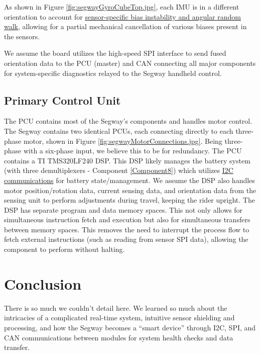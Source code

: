 \documentclass[]{formalLabReport}
\begin{document}
As shown in Figure \underline{\ref{fig:segwayGyroCubeTop.jpg}}, each IMU is in a different orientation to account for \href{https://base.xsens.com/hc/en-us/articles/209611089-Understanding-Sensor-Bias-offset-}{\underline{sensor-specific} \underline{bias instability and angular random walk}}, allowing for a partial mechanical cancellation of various biases present in the sensors. 

We assume the board utilizes the high-speed SPI interface to send fused orientation data to the PCU (master) and CAN connecting all major components for system-specific diagnostics relayed to the Segway handheld control.

\subsection{Primary Control Unit}
The PCU contains most of the Segway’s components and handles motor control. The Segway contains two identical PCUs, each connecting directly to each three-phase motor, shown in Figure \underline{\ref{fig:segwayMotorConnections.jpg}}. Being three-phase with a six-phase input, we believe this to be for redundancy. The PCU contains a TI TMS320LF240 DSP. This DSP likely manages the battery system (with three demultiplexers - Component \underline{\ref{Component8}}) which utilizes \href{https://github.com/martinbogo/pt-battery-diagnostics}{\underline{I2C communications}} for battery state/\newline management. We assume the DSP also handles motor position/rotation data, current sensing data, and orientation data from the sensing unit to perform adjustments during travel, keeping the rider upright. The DSP has separate program and data memory spaces. This not only allows for simultaneous instruction fetch and execution but also for simultaneous transfers between memory spaces. This removes the need to interrupt the process flow to fetch external instructions (such as reading from sensor SPI data), allowing the component to perform without halting.

\section{Conclusion}
There is so much we couldn’t detail here. We learned so much about the intricacies of a complicated real-time system, intuitive sensor shielding and processing, and how the Segway becomes a “smart device” through I2C, SPI, and CAN communications between modules for system health checks and data transfer.
\end{document}
